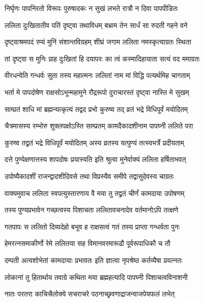 \twolineshloka
{निर्घृणः पापनिरतो विरूपः पुरुषादकः}
{न सुखं लभते रात्रौ न दिवा पापपीडितः}%

\twolineshloka
{ललिता दुःखितातीव पतिं दृष्ट्वा तथाविधम्}
{बभ्राम तेन सार्धं सा रुदती गहने वने}%

\twolineshloka
{दृष्ट्वाश्रमपदं रम्यं मुनिं संशान्तविग्रहम्}
{शीघ्रं जगाम ललिता नमस्कृत्याग्रतः स्थिता}%

\twolineshloka
{तां दृष्ट्वा स मुनिः प्राह दुःखितां हि दयापरः}
{का त्वं कस्मादिहायाता सत्यं वद ममाग्रतः}%


\twolineshloka
{वीरधन्वेति गन्धर्वः सुता तस्य महात्मनः}
{ललितां नाम मां विद्धि पत्यर्थमिह चागताम्}%

\twolineshloka
{भर्ता मे पापदोषेण राक्षसोऽभून्महामुने}
{रौद्ररूपो दुराचारस्तं दृष्ट्वा नास्ति मे सुखम्}%

\twolineshloka
{साम्प्रतं शाधि मां ब्रह्मन्यत्कृत्यं तद्वद प्रभो}
{कुरुष्व तद् व्रतं भद्रे विधिपूर्वं मयोदितम्}%


\twolineshloka
{चैत्रमासस्य रम्भोरु शुक्लपक्षोऽस्ति साम्प्रतम्}
{कामदैकादशीनाम पापघ्नी ललिते परा}%

\twolineshloka
{कुरुष्व तद्व्रतं भद्रे विधिपूर्वं मयोदितम्}
{अस्य व्रतस्य यत्पुण्यं तत्स्वभर्त्रे प्रदीयताम्}%

\twolineshloka
{दत्ते पुण्येक्षणात्तस्य शापदोषः प्रयास्यति}
{इति श्रुत्वा मुनेर्वाक्यं ललिता हर्षिताभवत्}%

\twolineshloka
{उपोष्यैकादशीं राजन्द्वादशीदिवसे तथा}
{विप्रस्यैव समीपे तद्वासुदेवस्य चाग्रतः}%

\twolineshloka
{वाक्यमुवाच ललिता स्वपत्युस्तारणाय वै}
{मया तु तद्व्रतं चीर्णं कामदाया उपोषणम्}%

\twolineshloka
{तस्य पुण्यप्रभावेन गच्छत्वस्य पिशाचता}
{ललितावचनादेव वर्तमानोऽपि तत्क्षणे}%

\twolineshloka
{गतपापः स ललितो दिव्यदेहो बभूव ह}
{राक्षसत्वं गतं तस्य प्राप्ता गन्धर्वता पुनः}%

\twolineshloka
{हेमरत्नसमाकीर्णो रेमे ललितया सह}
{विमानवरमारूढौ पूर्वरूपाधिकौ च तौ}%

\twolineshloka
{दम्पती अत्यशोभेतां कामदायाः प्रभावतः}
{इति ज्ञात्वा नृपश्रेष्ठ कर्तव्यैषा प्रयत्नतः}%

\twolineshloka
{लोकानां तु हितार्थाय तवाग्रे कथिता मया}
{ब्रह्महत्यादि पापघ्नी पिशाचत्वविनाशनी}%

\twolineshloka
{नातः परतरा काचित्त्रैलोक्ये सचराचरे}
{पठनाच्छ्रवणाद्राजन्वाजपेयफलं लभेत्}%

